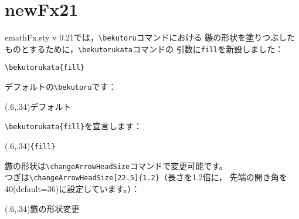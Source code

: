 \documentclass[a4j]{jarticle}
\begin{document}
\section{newFx21}
\textsf{emathFx.sty v 0.21}では，\verb+\bekutoru+コマンドにおける
鏃の形状を塗りつぶしたものとするために，\verb+\bekutorukata+コマンドの
引数に\verb+fill+を新設しました：
\begin{jquote}
\begin{verbatim}
\bekutorukata{fill}
\end{verbatim}
\end{jquote}
\bigskip

デフォルトの\verb+\bekutoru+です：
\begin{showEx}(.6,.34){デフォルト}
\end{showEx}

\verb+\bekutorukata{fill}+を宣言します：
\begin{showEx}(.6,.34){\texttt{\{fill\}}}
\end{showEx}

鏃の形状は\verb+\changeArrowHeadSize+コマンドで変更可能です。\\
つぎは\verb+\changeArrowHeadSize[22.5]{1.2}+（長さを1.2倍に，
先端の開き角を40\Deg(default=36\Deg)に設定しています。）：

\begin{showEx}(.6,.34){鏃の形状変更}
\end{showEx}
\end{document}
